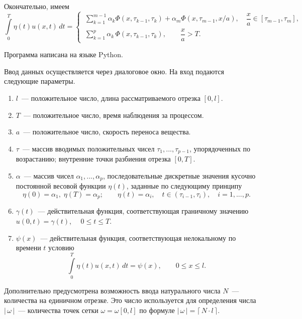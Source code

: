 \documentclass{article}
\renewcommand{\le}{\leqslant}
\theoremstyle{definition}
\begin{document}
Окончательно, имеем
\begin{equation} \label{int_eta_u_def}
\int\limits_{0}^{T} \eta(t) u(x,t)\,dt =
	\begin{cases}
	\, \sum\limits_{k = 1}^{m - 1} \alpha_k \varPhi(x, \tau_{k - 1}, \tau_k) + \alpha_m \varPhi(x, \tau_{m - 1}, x/a), 
	\quad \dfrac{x}{a} \in [\tau_{m - 1}, \tau_m], \\[5mm]
	\, \sum\limits_{k = 1}^{p} \alpha_k \,\varPhi(x, \tau_{k - 1}, \tau_k), \quad \quad \dfrac{x}{a} > T.
	\end{cases}
\end{equation}

Программа написана на языке Python.

Ввод данных осуществляется через диалоговое окно. На вход подаются следующие параметры.
\begin{enumerate}
	\item $l$~--- положительное число, длина рассматриваемого отрезка $[0,l]$.
	\item $T$~--- положительное число, время наблюдения за процессом.
	\item $a$~--- положительное число, скорость переноса вещества.
	\item $\tau$~--- массив вводимых положительных чисел $\tau_1, ..., \tau_{p - 1}$, упорядоченных по возрастанию; 
	внутренние точки разбиения отрезка $[0,T]$.
	\item $\alpha$~--- массив чисел $\alpha_1, ..., \alpha_p$, последовательные дискретные
	значения кусочно постоянной весовой функции $\eta(t)$, заданные по следующиму принципу
	\begin{equation*}
		\eta(0) = \alpha_1, \; \eta(T) = \alpha_p; \qquad \eta(t) = \alpha_i, \quad t \in (\tau_{i - 1}, \tau_i), \quad i = 1, ..., p.
	\end{equation*}  
	\item $\gamma(t)$~--- действительная функция, соответствующая граничному значению $u(0,t) = \gamma(t)$, $ \quad 0 \le t \le T$.
	\item $\psi(x)$~--- действительная функция, соответствующая нелокальному по времени $t$ условию
	\begin{equation*}
		\int\limits_{0}^{T} \eta(t) u(x, t)\,dt = \psi(x), 	\qquad 0 \le x \le l.
	\end{equation*}
\end{enumerate}
Дополнительно предусмотрена возможность ввода натурального числа $N$~--- количества на единичном отрезке. 
Это число используется для определения числа $|\, \omega \,|$~--- количества точек сетки $\omega = \omega[0,l]$ 
по формуле $|\, \omega \,| = \lceil\, N \!\cdot\! l \,\rceil$.
\end{document}
